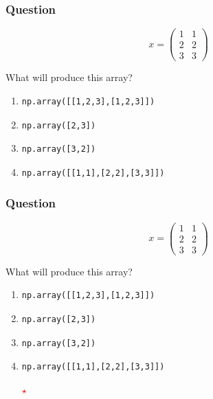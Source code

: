 \documentclass[11pt]{beamer}
\newcommand{\correctstar}{\textcolor{red}{$\star$}}
\begin{document}
\begin{frame}[fragile]
  \frametitle{Question}
  \Enlarge

$$
x =
\left(
\begin{array}{cc}
1 & 1 \\
2 & 2 \\
3 & 3
\end{array}
\right)
$$

  What will produce this array?

  \begin{enumerate}[label=\Alph*]
  \item
  \begin{Verbatim}
np.array([[1,2,3],[1,2,3]])
  \end{Verbatim}
  \item
  \begin{Verbatim}
np.array([2,3])
  \end{Verbatim}
  \item
  \begin{Verbatim}
np.array([3,2])
  \end{Verbatim}
  \item
  \begin{Verbatim}
np.array([[1,1],[2,2],[3,3]])
  \end{Verbatim}
  \end{enumerate}
\end{frame}

\begin{frame}[fragile]
  \frametitle{Question}
  \Enlarge

$$
x =
\left(
\begin{array}{cc}
1 & 1 \\
2 & 2 \\
3 & 3
\end{array}
\right)
$$

  What will produce this array?

  \begin{enumerate}[label=\Alph*]
  \item
  \begin{Verbatim}
np.array([[1,2,3],[1,2,3]])
  \end{Verbatim}
  \item
  \begin{Verbatim}
np.array([2,3])
  \end{Verbatim}
  \item
  \begin{Verbatim}
np.array([3,2])
  \end{Verbatim}
  \item
  \begin{Verbatim}
np.array([[1,1],[2,2],[3,3]])
  \end{Verbatim}
  \correctstar
  \end{enumerate}
\end{frame}
\end{document}
